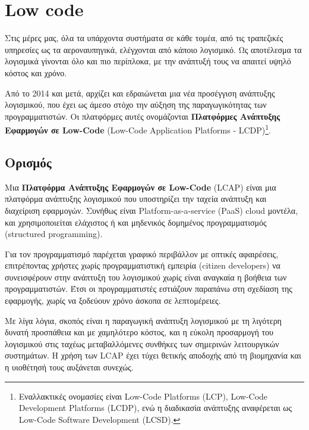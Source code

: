 \chapter{Low code}
    Στις μέρες μας, όλα τα υπάρχοντα συστήματα σε κάθε τομέα, από τις τραπεζικές υπηρεσίες ως τα αεροναυπηγικά, ελέγχονται από κάποιο λογισμικό. Ως αποτέλεσμα τα λογισμικά γίνονται όλο και πιο περίπλοκα, με την ανάπτυξή τους να απαιτεί υψηλό κόστος και χρόνο.

    Από το 2014 και μετά, αρχίζει και εδραιώνεται μια νέα προσέγγιση ανάπτυξης λογισμικού, που έχει ως άμεσο στόχο την αύξηση της παραγωγικότητας των προγραμματιστών. Οι πλατφόρμες αυτές ονομάζονται \textbf{Πλατφόρμες Ανάπτυξης Εφαρμογών σε Low-Code} (Low-Code Application Platforms - LCDP)\footnote{Εναλλακτικές ονομασίες είναι Low-Code Platforms (LCP), Low-Code Development Platforms (LCDP), ενώ η διαδικασία ανάπτυξης αναφέρεται ως Low-Code Software Development (LCSD).}. \cite{Bock2021}

    \section{Ορισμός}
        Μια \textbf{Πλατφόρμα Ανάπτυξης Εφαρμογών σε Low-Code} (LCAP) είναι μια πλατφόρμα ανάπτυξης λογισμικού που υποστηρίζει την ταχεία ανάπτυξη και διαχείριση εφαρμογών. Συνήθως είναι Platform-as-a-service (PaaS) cloud μοντέλα, και χρησιμοποιείται ελάχιστος ή και μηδενικός δομημένος προγραμματισμός (structured \linebreak programming).

        Για τον προγραμματισμό παρέχεται γραφικό περιβάλλον με οπτικές αφαιρέσεις, επιτρέποντας χρήστες χωρίς προγραμματιστική εμπειρία (citizen developers) να συνεισφέρουν στην ανάπτυξη του λογισμικού χωρίς είναι αναγκαία η βοήθεια των προγραμματιστών. Έτσι οι προγραμματιστές εστιάζουν παραπάνω στη σχεδίαση της εφαρμογής, χωρίς να ξοδεύουν χρόνο άσκοπα σε λεπτομέρειες.

        Με λίγα λόγια, σκοπός είναι η παραγωγική ανάπτυξη λογισμικού με τη λιγότερη δυνατή προσπάθεια και με χαμηλότερο κόστος, και η εύκολη προσαρμογή του λογισμικού στις ταχέως μεταβαλλόμενες συνθήκες των σημερινών λειτουργικών συστημάτων. Η χρήση των LCAP έχει τύχει θετικής αποδοχής από τη βιομηχανία και η υιοθέτησή τους αυξάνεται συνεχώς. \cite{Bock2021} \cite{Bucaioni2022} \cite{Sahay2020}

        \begin{displayquote} \justifying
             \cite{Ibm_2024}
        \end{displayquote}

